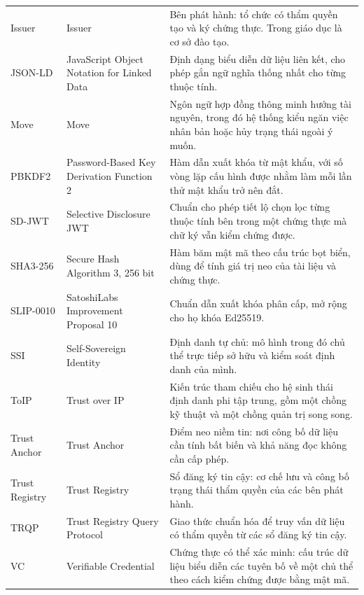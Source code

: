 \begin{longtable}{p{} p{} p{}}
Issuer & Issuer & Bên phát hành: tổ chức có thẩm quyền tạo và ký chứng thực. Trong giáo dục là cơ sở đào tạo. \\

JSON-LD & JavaScript Object Notation for Linked Data & Định dạng biểu diễn dữ liệu liên kết, cho phép gắn ngữ nghĩa thống nhất cho từng thuộc tính. \\

Move & Move & Ngôn ngữ hợp đồng thông minh hướng tài nguyên, trong đó hệ thống kiểu ngăn việc nhân bản hoặc hủy trạng thái ngoài ý muốn. \\

PBKDF2 & Password-Based Key Derivation Function 2 & Hàm dẫn xuất khóa từ mật khẩu, với số vòng lặp cấu hình được nhằm làm mỗi lần thử mật khẩu trở nên đắt. \\

SD-JWT & Selective Disclosure JWT & Chuẩn cho phép tiết lộ chọn lọc từng thuộc tính bên trong một chứng thực mà chữ ký vẫn kiểm chứng được. \\

SHA3-256 & Secure Hash Algorithm 3, 256 bit & Hàm băm mật mã theo cấu trúc bọt biển, dùng để tính giá trị neo của tài liệu và chứng thực. \\

SLIP-0010 & SatoshiLabs Improvement Proposal 10 & Chuẩn dẫn xuất khóa phân cấp, mở rộng cho họ khóa Ed25519. \\

SSI & Self-Sovereign Identity & Định danh tự chủ: mô hình trong đó chủ thể trực tiếp sở hữu và kiểm soát định danh của mình. \\

ToIP & Trust over IP & Kiến trúc tham chiếu cho hệ sinh thái định danh phi tập trung, gồm một chồng kỹ thuật và một chồng quản trị song song. \\

Trust Anchor & Trust Anchor & Điểm neo niềm tin: nơi công bố dữ liệu cần tính bất biến và khả năng đọc không cần cấp phép. \\

Trust Registry & Trust Registry & Sổ đăng ký tin cậy: cơ chế lưu và công bố trạng thái thẩm quyền của các bên phát hành. \\

TRQP & Trust Registry Query Protocol & Giao thức chuẩn hóa để truy vấn dữ liệu có thẩm quyền từ các sổ đăng ký tin cậy. \\

VC & Verifiable Credential & Chứng thực có thể xác minh: cấu trúc dữ liệu biểu diễn các tuyên bố về một chủ thể theo cách kiểm chứng được bằng mật mã. \\


\end{longtable}
